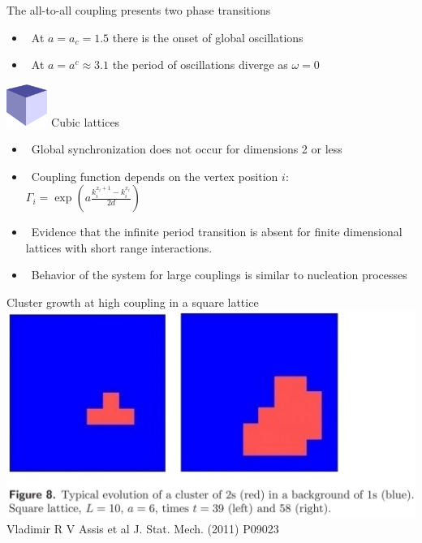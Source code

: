 \documentclass[serif,mathserif]{beamer}
\begin{document}
\begin{frame}
    The all-to-all coupling presents two phase transitions
    \begin{itemize}
        \vspace{0.35cm}
        \item \ \pause At $a=a_c=1.5$ there is the onset of global oscillations
        \vspace{0.35cm}
        \item \ \pause At $a=a^c\approx 3.1$ the period of oscillations diverge as $\omega=0$
    \end{itemize}
\end{frame}

\begin{frame}
    \includegraphics[width=0.1\textwidth]{cube.eps}\hspace{0.5cm}
    Cubic lattices
    \begin{itemize}
        \vspace{0.25cm}
        \item \ \pause Global synchronization does not occur for dimensions 2 or less
        \vspace{0.25cm}
        \item \ \pause Coupling function depends on the vertex position $i$:\\
            $\Gamma_i = \exp \left( a\frac{k_i^{x_i+1} - k_i^{x_i}}{2d} \right)$
        \vspace{0.25cm}
        \item \ \pause Evidence that the infinite period transition is absent for finite dimensional lattices with short range interactions.
        \vspace{0.25cm}
        \item \ \pause Behavior of the system for large couplings is similar to nucleation processes
    \end{itemize}
\end{frame}

\begin{frame}
    \centering
    Cluster growth at high coupling in a square lattice\\
    \vspace{0.8cm}
    \includegraphics[height=0.6\textheight]{nucleation.eps}\\
    Vladimir R V Assis et al J. Stat. Mech. (2011) P09023
\end{frame}
\end{document}
